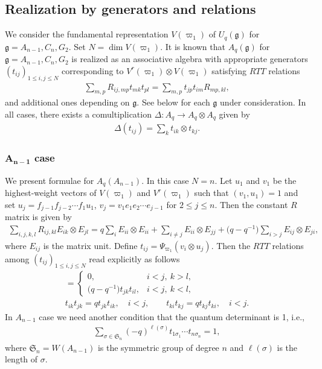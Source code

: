 \documentclass[11pt]{article}
\newcommand{\geh}{\mathfrak{g}}
\newcommand{\ot}{\otimes}
\begin{document}
\subsection{Realization by generators and relations}

We consider the fundamental representation $V(\varpi_1)$ of $U_q(\geh)$ for $\geh=A_{n-1},C_n,G_2$.
Set $N=\dim V(\varpi_1)$. It is known \cite{D86,RTF} that $A_q(\geh)$ for $\geh=A_{n-1},C_n,G_2$ is
realized as an associative algebra with appropriate generators $(t_{ij})_{1\le i,j \le N}$
corresponding to $V^r(\varpi_1)\ot V(\varpi_1)$ satisfying $RTT$ relations
\begin{gather}\label{a:rtt}
 \sum_{m,p}R_{ij,mp}t_{mk}t_{pl}
= \sum_{m,p}t_{jp}t_{im}R_{mp,kl},
\end{gather}
and additional ones depending on $\geh$.
See below for each $\geh$ under consideration.
In all cases, there exists a comultiplication $\Delta: A_q \rightarrow A_q \otimes A_q$ given by
\begin{gather}\label{a:cpro}
\Delta(t_{ij}) = \sum_k t_{ik}\otimes t_{kj}.
\end{gather}

\subsubsection[$A_{n-1}$ case]{$\boldsymbol{A_{n-1}}$ case}\label{a:sss:a1}

We present formulae for $A_q(A_{n-1})$. In this case $N=n$.
Let $u_1$ and $v_1$ be the highest-weight vectors of
$V(\varpi_1)$ and $V^r(\varpi_1)$ such that $(v_1,u_1)=1$ and
set $u_j=f_{j-1}f_{j-2}\cdots f_1u_1$, $v_j=v_1e_1e_2\cdots e_{j-1}$
for $2\le j\le n$. Then the constant $R$ matrix is given by
\begin{gather*}
\sum_{i,j,k,l}R_{ij,kl}E_{ik}\otimes E_{jl}=
q\sum_i E_{ii}\otimes E_{ii} + \sum_{i\neq j}E_{ii}\otimes E_{jj}
+\big(q-q^{-1}\big)\sum_{i>j}E_{ij}\otimes E_{ji},
\end{gather*}
where $E_{ij}$ is the matrix unit. Def\/ine $t_{ij}=\Psi_{\varpi_1}(v_i \otimes u_j)$.
Then the $RTT$ relations among $(t_{ij})_{1\le i,j\le N}$ read explicitly as follows
\begin{gather*}
 [t_{ik}, t_{jl}]=\begin{cases}0, & i<j, \ k>l,\\
\big(q-q^{-1}\big)t_{jk}t_{il}, &  i<j, \ k<l,
\end{cases}\\
 t_{ik}t_{jk} = q t_{jk}t_{ik},\quad i<j,\qquad
t_{ki}t_{kj} = q t_{kj}t_{ki},\quad i<j.
\end{gather*}
In $A_{n-1}$ case we need another condition that the quantum determinant is 1, i.e.,
\begin{gather*}
\sum_{\sigma \in \mathfrak{S}_n}(-q)^{\ell(\sigma)}
t_{1\sigma_1}\cdots t_{n\sigma_n} = 1,
\end{gather*}
where $\mathfrak{S}_n=W(A_{n-1})$ is the symmetric group of degree $n$ and
$\ell(\sigma)$ is the length of $\sigma$.
\end{document}
